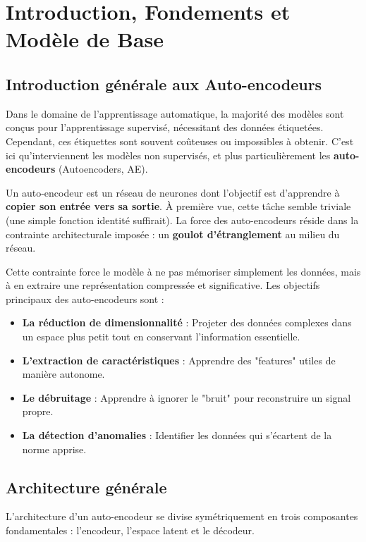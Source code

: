 \documentclass[11pt,a4paper]{report}
\begin{document}
\chapter{Introduction, Fondements et Modèle de Base}
\pagestyle{fancy}
\setcounter{page}{1}

\section{Introduction générale aux Auto-encodeurs}

Dans le domaine de l'apprentissage automatique, la majorité des modèles sont conçus pour l'apprentissage supervisé, nécessitant des données étiquetées. Cependant, ces étiquettes sont souvent coûteuses ou impossibles à obtenir. C'est ici qu'interviennent les modèles non supervisés, et plus particulièrement les \textbf{auto-encodeurs} (Autoencoders, AE).

Un auto-encodeur est un réseau de neurones dont l'objectif est d'apprendre à \textbf{copier son entrée vers sa sortie}. À première vue, cette tâche semble triviale (une simple fonction identité suffirait). La force des auto-encodeurs réside dans la contrainte architecturale imposée : un \textbf{goulot d'étranglement} au milieu du réseau. 

Cette contrainte force le modèle à ne pas mémoriser simplement les données, mais à en extraire une représentation compressée et significative. Les objectifs principaux des auto-encodeurs sont :
\begin{itemize}
    \item \textbf{La réduction de dimensionnalité} : Projeter des données complexes dans un espace plus petit tout en conservant l'information essentielle.
    \item \textbf{L'extraction de caractéristiques} : Apprendre des "features" utiles de manière autonome.
    \item \textbf{Le débruitage} : Apprendre à ignorer le "bruit" pour reconstruire un signal propre.
    \item \textbf{La détection d'anomalies} : Identifier les données qui s'écartent de la norme apprise.
\end{itemize}

\section{Architecture générale}

L'architecture d'un auto-encodeur se divise symétriquement en trois composantes fondamentales : l'encodeur, l'espace latent et le décodeur.
\end{document}
